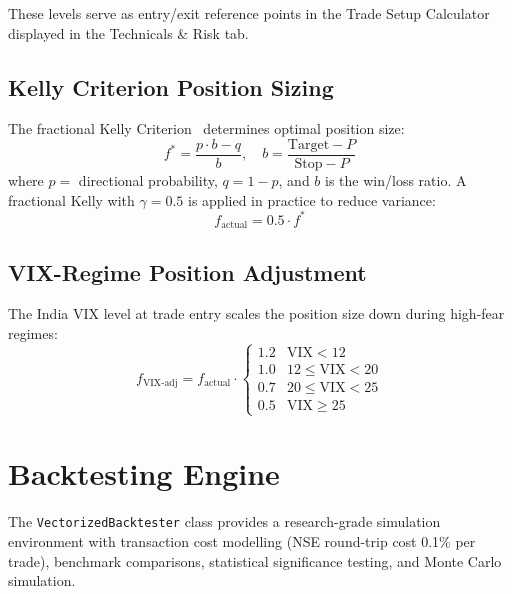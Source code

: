 \documentclass[10pt,a4paper,twoside]{article}
\begin{document}
These levels serve as entry/exit reference points in the Trade Setup Calculator
displayed in the Technicals \& Risk tab.

\subsection{Kelly Criterion Position Sizing}

The fractional Kelly Criterion~\cite{kelly1956} determines optimal position size:
\begin{equation}
  f^* = \frac{p \cdot b - q}{b}, \quad b = \frac{\text{Target} - P}{\text{Stop} - P}
\end{equation}
where $p = $ directional probability, $q = 1 - p$, and $b$ is the win/loss
ratio. A fractional Kelly with $\gamma = 0.5$ is applied in practice to reduce
variance:
\begin{equation}
  f_{\text{actual}} = 0.5 \cdot f^*
\end{equation}

\subsection{VIX-Regime Position Adjustment}

The India VIX level at trade entry scales the position size down during
high-fear regimes:
\begin{equation}
  f_{\text{VIX-adj}} = f_{\text{actual}} \cdot \begin{cases}
    1.2 & \text{VIX} < 12 \\
    1.0 & 12 \leq \text{VIX} < 20 \\
    0.7 & 20 \leq \text{VIX} < 25 \\
    0.5 & \text{VIX} \geq 25
  \end{cases}
\end{equation}

\section{Backtesting Engine}
\label{sec:backtest}

The \texttt{VectorizedBacktester} class provides a research-grade simulation
environment with transaction cost modelling (NSE round-trip cost 0.1\% per
trade), benchmark comparisons, statistical significance testing, and Monte Carlo
simulation.
\end{document}
